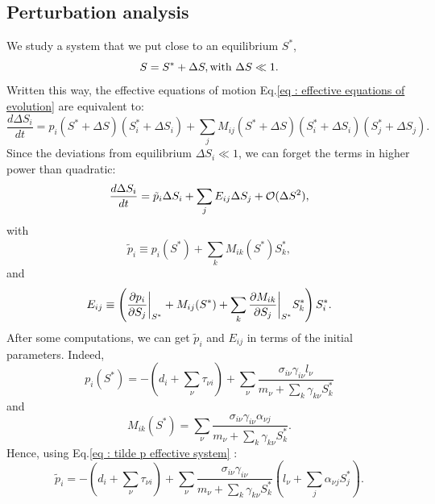 \documentclass[12pt, titlepage]{report}
\begin{document}
\subsection{Perturbation analysis}
We study a system that we put close to an equilibrium $S^*$, \ie
\begin{equation}
S=S^*+\Delta S, \\ \text{with } \Delta S \ll 1.
\end{equation}
Written this way, the effective equations of motion Eq.\eqref{eq : effective equations of evolution} are equivalent to:
\begin{equation}
\frac{d\Delta S_i}{dt} = p_i(S^*+\Delta S)\left(S^*_i + \Delta S_i\right)+\sum_j M_{ij}(S^*+\Delta S)\left(S^*_i +\Delta S_i\right)\left(S^*_j +\Delta S_j\right).
\end{equation}
Since the deviations from equilibrium $\Delta S_i \ll 1$, we can forget the terms in higher power than quadratic:
\begin{equation}
\frac{d\Delta S_i}{dt} = \tilde{p}_i \Delta S_i + \sum_j E_{ij} \Delta S_j + \mathcal{O}(\Delta S^2),\label{eq : effective equ evol at O(D2)}
\end{equation}
with
\begin{equation}
\tilde{p}_i \equiv p_i(S^*) + \sum_k M_{ik}(S^*)S_k^*, \label{eq : tilde p effective system}
\end{equation}
and
\begin{equation}
E_{ij} \equiv \left(\dfrac{\partial p_i}{\partial S_j}\bigg\rvert_{S^*}+M_{ij}(S^*)+\sum_k \dfrac{\partial M_{ik}}{\partial S_j}\bigg\rvert_{S^*}S^*_k\right)S^*_i.
\end{equation}
After some computations, we can get $\tilde{p}_i$ and $E_{ij}$ in terms of the initial parameters. Indeed,
\begin{equation}
p_i(S^*)= -\left(d_i + \sum_\nu \tau_{\nu i}\right) + \sum_\nu \frac{\sigma_{i\nu}\gamma_{i\nu}l_\nu}{m_\nu + \sum_k \gamma_{k\nu}S^*_k}
\end{equation}
and
\begin{equation}
M_{ik}(S^*) = \sum_\nu \frac{\sigma_{i\nu}\gamma_{i\nu}\alpha_{\nu j}}{m_\nu + \sum_k \gamma_{k\nu}S^*_k}.
\end{equation}
Hence, using Eq.\eqref{eq : tilde p effective system} :
\begin{equation}
\tilde{p}_i = - \left(d_i + \sum_\nu \tau_{\nu i}\right) + \sum_\nu \frac{\sigma_{i\nu}\gamma_{i\nu}}{m_\nu + \sum_k \gamma_{k\nu}S^*_k}\left(l_\nu+\sum_{j}\alpha_{\nu j} S^*_j\right).
\end{equation}
\end{document}
